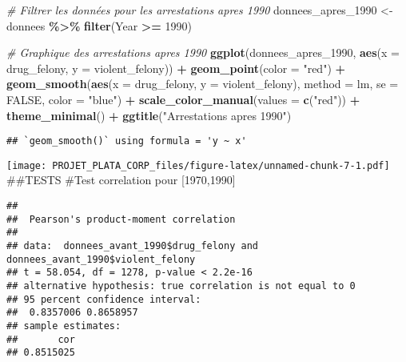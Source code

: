 \documentclass[
]{article}
\newenvironment{Shaded}{\begin{snugshade}}{\end{snugshade}}
\newcommand{\AttributeTok}[1]{\textcolor[rgb]{0.13,0.29,0.53}{#1}}
\newcommand{\CommentTok}[1]{\textcolor[rgb]{0.56,0.35,0.01}{\textit{#1}}}
\newcommand{\ConstantTok}[1]{\textcolor[rgb]{0.56,0.35,0.01}{#1}}
\newcommand{\DecValTok}[1]{\textcolor[rgb]{0.00,0.00,0.81}{#1}}
\newcommand{\FunctionTok}[1]{\textcolor[rgb]{0.13,0.29,0.53}{\textbf{#1}}}
\newcommand{\NormalTok}[1]{#1}
\newcommand{\OtherTok}[1]{\textcolor[rgb]{0.56,0.35,0.01}{#1}}
\newcommand{\SpecialCharTok}[1]{\textcolor[rgb]{0.81,0.36,0.00}{\textbf{#1}}}
\newcommand{\StringTok}[1]{\textcolor[rgb]{0.31,0.60,0.02}{#1}}
\begin{document}
\begin{Shaded}
\begin{Highlighting}[]
\CommentTok{\# Filtrer les données pour les arrestations apres 1990}
\NormalTok{donnees\_apres\_1990 }\OtherTok{\textless{}{-}}\NormalTok{ donnees }\SpecialCharTok{\%\textgreater{}\%} \FunctionTok{filter}\NormalTok{(Year }\SpecialCharTok{\textgreater{}=} \DecValTok{1990}\NormalTok{)}

\CommentTok{\# Graphique des arrestations apres 1990}
\FunctionTok{ggplot}\NormalTok{(donnees\_apres\_1990, }\FunctionTok{aes}\NormalTok{(}\AttributeTok{x =}\NormalTok{ drug\_felony, }\AttributeTok{y =}\NormalTok{ violent\_felony)) }\SpecialCharTok{+} 
  \FunctionTok{geom\_point}\NormalTok{(}\AttributeTok{color =} \StringTok{"red"}\NormalTok{) }\SpecialCharTok{+}
  \FunctionTok{geom\_smooth}\NormalTok{(}\FunctionTok{aes}\NormalTok{(}\AttributeTok{x =}\NormalTok{ drug\_felony, }\AttributeTok{y =}\NormalTok{ violent\_felony), }\AttributeTok{method =}\NormalTok{ lm, }\AttributeTok{se =} \ConstantTok{FALSE}\NormalTok{, }\AttributeTok{color =} \StringTok{"blue"}\NormalTok{) }\SpecialCharTok{+}
  \FunctionTok{scale\_color\_manual}\NormalTok{(}\AttributeTok{values =} \FunctionTok{c}\NormalTok{(}\StringTok{"red"}\NormalTok{)) }\SpecialCharTok{+}
  \FunctionTok{theme\_minimal}\NormalTok{() }\SpecialCharTok{+}
  \FunctionTok{ggtitle}\NormalTok{(}\StringTok{"Arrestations apres 1990"}\NormalTok{)}
\end{Highlighting}
\end{Shaded}

\begin{verbatim}
## `geom_smooth()` using formula = 'y ~ x'
\end{verbatim}

\texttt{[image: PROJET\_PLATA\_CORP\_files/figure-latex/unnamed-chunk-7-1.pdf]}
\#\#TESTS \#Test correlation pour {[}1970,1990{]}

\begin{Shaded}
\end{Shaded}

\begin{verbatim}
## 
##  Pearson's product-moment correlation
## 
## data:  donnees_avant_1990$drug_felony and donnees_avant_1990$violent_felony
## t = 58.054, df = 1278, p-value < 2.2e-16
## alternative hypothesis: true correlation is not equal to 0
## 95 percent confidence interval:
##  0.8357006 0.8658957
## sample estimates:
##       cor 
## 0.8515025
\end{verbatim}
\end{document}
